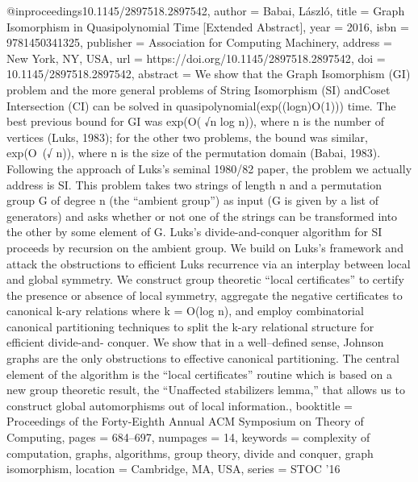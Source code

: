 @inproceedings{10.1145/2897518.2897542,
author = {Babai, L\'{a}szl\'{o}},
title = {Graph Isomorphism in Quasipolynomial Time [Extended Abstract]},
year = {2016},
isbn = {9781450341325},
publisher = {Association for Computing Machinery},
address = {New York, NY, USA},
url = {https://doi.org/10.1145/2897518.2897542},
doi = {10.1145/2897518.2897542},
abstract = {We show that the Graph Isomorphism (GI) problem and the more general problems of String Isomorphism (SI) andCoset Intersection (CI) can be solved in quasipolynomial(exp((logn)O(1))) time. The best previous bound for GI was exp(O( √n log n)), where n is the number of vertices (Luks, 1983); for the other two problems, the bound was similar, exp(O~(√ n)), where n is the size of the permutation domain (Babai, 1983). Following the approach of Luks’s seminal 1980/82 paper, the problem we actually address is SI. This problem takes two strings of length n and a permutation group G of degree n (the “ambient group”) as input (G is given by a list of generators) and asks whether or not one of the strings can be transformed into the other by some element of G. Luks’s divide-and-conquer algorithm for SI proceeds by recursion on the ambient group. We build on Luks’s framework and attack the obstructions to efficient Luks recurrence via an interplay between local and global symmetry. We construct group theoretic “local certificates” to certify the presence or absence of local symmetry, aggregate the negative certificates to canonical k-ary relations where k = O(log n), and employ combinatorial canonical partitioning techniques to split the k-ary relational structure for efficient divide-and- conquer. We show that in a well–defined sense, Johnson graphs are the only obstructions to effective canonical partitioning. The central element of the algorithm is the “local certificates” routine which is based on a new group theoretic result, the “Unaffected stabilizers lemma,” that allows us to construct global automorphisms out of local information.},
booktitle = {Proceedings of the Forty-Eighth Annual ACM Symposium on Theory of Computing},
pages = {684–697},
numpages = {14},
keywords = {complexity of computation, graphs, algorithms, group theory, divide and conquer, graph isomorphism},
location = {Cambridge, MA, USA},
series = {STOC '16}
}